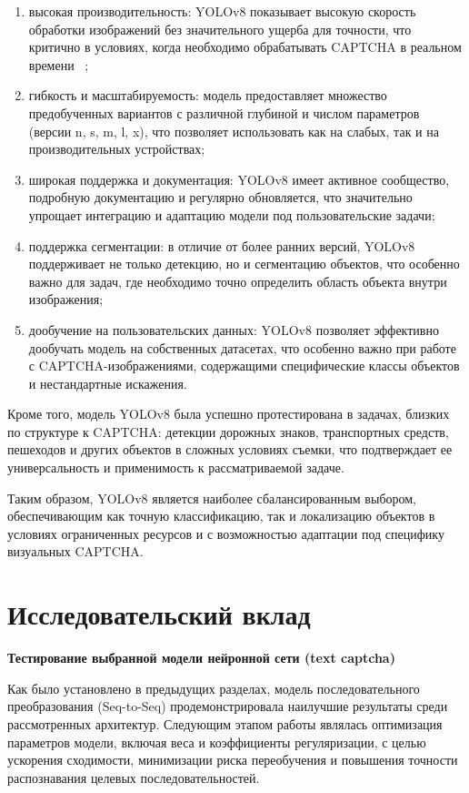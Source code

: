 \begin{enumerate}
    \item высокая производительность: YOLOv8 показывает высокую скорость 
    обработки изображений без значительного ущерба для точности, что критично в 
    условиях, когда необходимо обрабатывать CAPTCHA в реальном времени~
    \cite{bochkovskiy2020yolov4};
    \item гибкость и масштабируемость: модель предоставляет множество 
    предобученных вариантов с различной глубиной и числом параметров (версии n, 
    s, m, l, x), что позволяет использовать как на слабых, так и на 
    производительных устройствах;
    \item широкая поддержка и документация: YOLOv8 имеет активное сообщество, 
    подробную документацию и регулярно обновляется, что значительно упрощает 
    интеграцию и адаптацию модели под пользовательские задачи;
    \item поддержка сегментации: в отличие от более ранних версий, YOLOv8 
    поддерживает не только детекцию, но и сегментацию объектов, что особенно 
    важно для задач, где необходимо точно определить область объекта внутри 
    изображения;
    \item дообучение на пользовательских данных: YOLOv8 позволяет эффективно 
    дообучать модель на собственных датасетах, что особенно важно при работе с 
    CAPTCHA-изображениями, содержащими специфические классы объектов и 
    нестандартные искажения.
\end{enumerate}

Кроме того, модель YOLOv8 была успешно протестирована в задачах, близких по 
структуре к CAPTCHA: детекции дорожных знаков, транспортных средств, пешеходов и 
других объектов в сложных условиях съемки, что подтверждает ее универсальность и 
применимость к рассматриваемой задаче.

Таким образом, YOLOv8 является наиболее сбалансированным выбором, обеспечивающим 
как точную классификацию, так и локализацию объектов в условиях ограниченных 
ресурсов и с возможностью адаптации под специфику визуальных CAPTCHA.

\section{Исследовательский вклад}

\textbf{Тестирование выбранной модели нейронной сети (text captcha)}

Как было установлено в предыдущих разделах, модель последовательного 
преобразования (Seq-to-Seq) продемонстрировала наилучшие результаты среди 
рассмотренных архитектур. Следующим этапом работы являлась оптимизация параметров 
модели, включая веса и коэффициенты регуляризации, с целью ускорения сходимости, 
минимизации риска переобучения и повышения точности распознавания целевых 
последовательностей.

